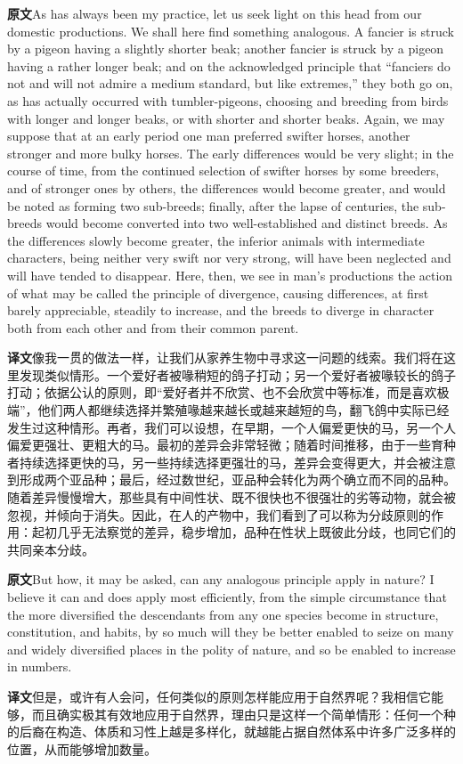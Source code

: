 \documentclass[UTF8,zihao=-4]{ctexart}
\newcommand{\BodyFont}{\fontsize{10.5pt}{15.5pt}\selectfont}
\newcommand{\origlabel}{\textbf{原文}\quad}
\newcommand{\translabel}{\textbf{译文}\quad}
\newenvironment{enblock}{\par\noindent\begingroup\BodyFont\origlabel}{\par\endgroup}
\newenvironment{zhblock}{\par\noindent\begingroup\BodyFont\translabel}{\par\endgroup\vspace{0.35em}}
\newcommand{\pair}[2]{\begin{enblock}#1\end{enblock}\begin{zhblock}#2\end{zhblock}}
\begin{document}
\pair{As has always been my practice, let us seek light on this head from our domestic productions. We shall here find something analogous. A fancier is struck by a pigeon having a slightly shorter beak; another fancier is struck by a pigeon having a rather longer beak; and on the acknowledged principle that “fanciers do not and will not admire a medium standard, but like extremes,” they both go on, as has actually occurred with tumbler-pigeons, choosing and breeding from birds with longer and longer beaks, or with shorter and shorter beaks. Again, we may suppose that at an early period one man preferred swifter horses, another stronger and more bulky horses. The early differences would be very slight; in the course of time, from the continued selection of swifter horses by some breeders, and of stronger ones by others, the differences would become greater, and would be noted as forming two sub-breeds; finally, after the lapse of centuries, the sub-breeds would become converted into two well-established and distinct breeds. As the differences slowly become greater, the inferior animals with intermediate characters, being neither very swift nor very strong, will have been neglected and will have tended to disappear. Here, then, we see in man's productions the action of what may be called the principle of divergence, causing differences, at first barely appreciable, steadily to increase, and the breeds to diverge in character both from each other and from their common parent.}{像我一贯的做法一样，让我们从家养生物中寻求这一问题的线索。我们将在这里发现类似情形。一个爱好者被喙稍短的鸽子打动；另一个爱好者被喙较长的鸽子打动；依据公认的原则，即“爱好者并不欣赏、也不会欣赏中等标准，而是喜欢极端”，他们两人都继续选择并繁殖喙越来越长或越来越短的鸟，翻飞鸽中实际已经发生过这种情形。再者，我们可以设想，在早期，一个人偏爱更快的马，另一个人偏爱更强壮、更粗大的马。最初的差异会非常轻微；随着时间推移，由于一些育种者持续选择更快的马，另一些持续选择更强壮的马，差异会变得更大，并会被注意到形成两个亚品种；最后，经过数世纪，亚品种会转化为两个确立而不同的品种。随着差异慢慢增大，那些具有中间性状、既不很快也不很强壮的劣等动物，就会被忽视，并倾向于消失。因此，在人的产物中，我们看到了可以称为分歧原则的作用：起初几乎无法察觉的差异，稳步增加，品种在性状上既彼此分歧，也同它们的共同亲本分歧。}

\pair{But how, it may be asked, can any analogous principle apply in nature? I believe it can and does apply most efficiently, from the simple circumstance that the more diversified the descendants from any one species become in structure, constitution, and habits, by so much will they be better enabled to seize on many and widely diversified places in the polity of nature, and so be enabled to increase in numbers.}{但是，或许有人会问，任何类似的原则怎样能应用于自然界呢？我相信它能够，而且确实极其有效地应用于自然界，理由只是这样一个简单情形：任何一个种的后裔在构造、体质和习性上越是多样化，就越能占据自然体系中许多广泛多样的位置，从而能够增加数量。}
\end{document}

